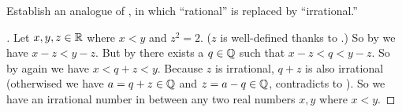 \begin{ex}\label{i:ex:5.5.5}
  Establish an analogue of , in which ``rational'' is replaced by ``irrational.''
\end{ex}

\begin{proof}[]
  Let \(x, y, z \in \mathbb{R}\) where \(x < y\) and \(z^2 = 2\).
  (\(z\) is well-defined thanks to .)
  So by  we have \(x - z < y - z\).
  But by  there exists a \(q \in \mathbb{Q}\) such that \(x - z < q < y - z\).
  So by  again we have \(x < q + z < y\).
  Because \(z\) is irrational, \(q + z\) is also irrational
  (otherwised we have \(a = q + z \in \mathbb{Q}\) and \(z = a - q \in \mathbb{Q}\), contradicts to ).
  So we have an irrational number in between any two real numbers \(x, y\) where \(x < y\).
\end{proof}
